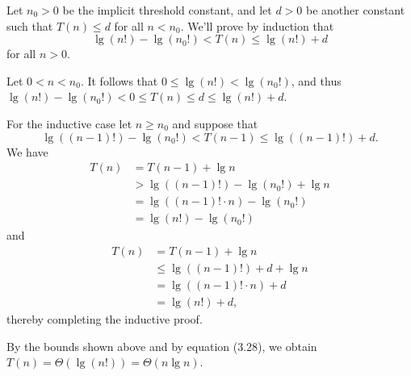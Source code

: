Let $n_0>0$ be the implicit threshold constant, and let $d>0$ be another constant such that $T(n)\le d$ for all $n<n_0$.
We'll prove by induction that
\[
    \lg(n!)-\lg(n_0!) < T(n) \le \lg(n!)+d
\]
for all $n>0$.

Let $0<n<n_0$.
It follows that $0\le\lg(n!)<\lg(n_0!)$, and thus $\lg(n!)-\lg(n_0!)<0\le T(n)\le d\le\lg(n!)+d$.

For the inductive case let $n\ge n_0$ and suppose that
\[
    \lg((n-1)!)-\lg(n_0!) < T(n-1) \le \lg((n-1)!)+d.
\]
We have
\begin{align*}
    T(n) &= T(n-1)+\lg n \\
    &> \lg((n-1)!)-\lg(n_0!)+\lg n \\
    &= \lg((n-1)!\cdot n)-\lg(n_0!) \\
    &= \lg(n!)-\lg(n_0!)
\end{align*}
and
\begin{align*}
    T(n) &= T(n-1)+\lg n \\
    &\le \lg((n-1)!)+d+\lg n \\
    &= \lg((n-1)!\cdot n)+d \\
    &= \lg(n!)+d,
\end{align*}
thereby completing the inductive proof.

By the bounds shown above and by equation (3.28), we obtain $T(n)=\Theta(\lg(n!))=\Theta(n\lg n)$.
